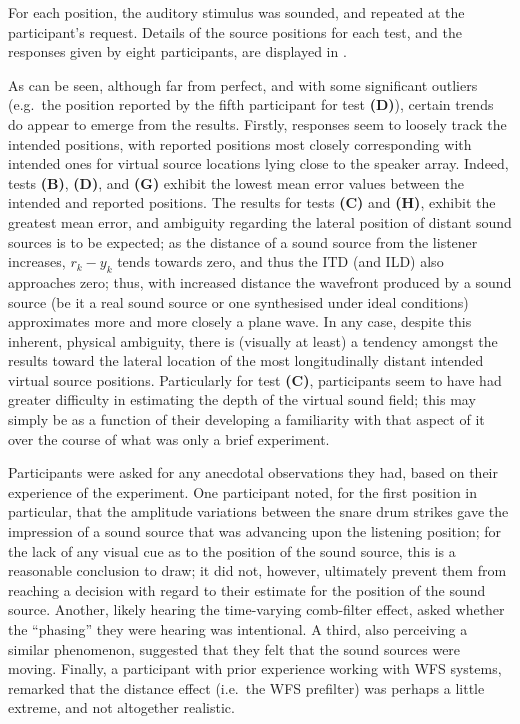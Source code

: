 For each position, the auditory stimulus was sounded, and repeated at the
participant's request.
Details of the source positions for each test, and the responses given by
eight participants, are displayed in .

As can be seen, although far from perfect, and with some significant
outliers (e.g.\ the position reported by the fifth participant for test
\textbf{(D)}), certain trends do appear to emerge from the results.
Firstly, responses seem to loosely track the intended positions, with reported
positions most closely corresponding with intended ones for virtual source
locations lying close to the speaker array.
Indeed, tests \textbf{(B)}, \textbf{(D)}, and \textbf{(G)} exhibit the lowest
mean error values between the intended and reported positions.
The results for tests \textbf{(C)} and \textbf{(H)}, exhibit the greatest mean
error, and ambiguity regarding the lateral position of distant sound sources is
to be expected;
as the distance of a sound source from the listener increases, $r_k - y_k$
tends towards zero, and thus the ITD (and ILD) also approaches zero;
thus, with increased distance the wavefront produced by a sound source (be it a
real sound source or one synthesised under ideal conditions) approximates more
and more closely a plane wave.
In any case, despite this inherent, physical ambiguity, there is (visually
at least) a tendency amongst the results toward the lateral location of the
most longitudinally distant intended virtual source positions.
Particularly for test \textbf{(C)}, participants seem to have had greater
difficulty in estimating the depth of the virtual sound field; this may simply
be as a function of their developing a familiarity with that aspect of it over
the course of what was only a brief experiment.

Participants were asked for any anecdotal observations they had, based on their
experience of the experiment.
One participant noted, for the first position in particular, that the amplitude
variations between the snare drum strikes gave the impression of a sound source
that was advancing upon the listening position; for the lack of any visual cue
as to the position of the sound source, this is a reasonable conclusion to draw;
it did not, however, ultimately prevent them from reaching a decision with
regard to their estimate for the position of the sound source.
Another, likely hearing the time-varying comb-filter effect, asked whether the
``phasing'' they were hearing was intentional.
A third, also perceiving a similar phenomenon, suggested that they
felt that the sound sources were moving.
Finally, a participant with prior experience working with WFS systems, remarked
that the distance effect (i.e.\ the WFS prefilter) was perhaps a little extreme,
and not altogether realistic.
